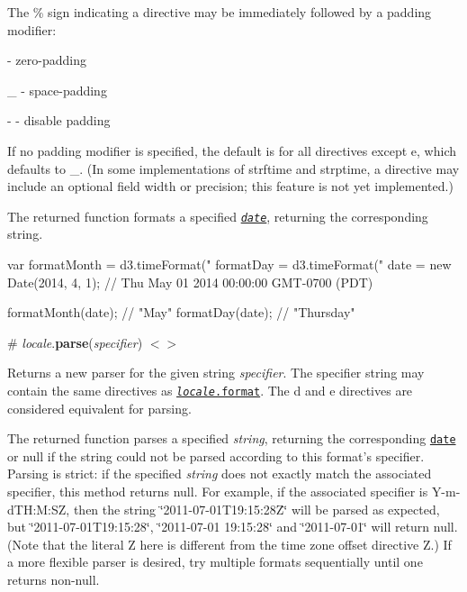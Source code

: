The {\ttfamily \%} sign indicating a directive may be immediately followed by a padding modifier\+:


\begin{DoxyItemize}
\item {} -\/ zero-\/padding
\item {\ttfamily \+\_\+} -\/ space-\/padding
\item {\ttfamily -\/} -\/ disable padding
\end{DoxyItemize}

If no padding modifier is specified, the default is {} for all directives except {\ttfamily e}, which defaults to {\ttfamily \+\_\+}. (In some implementations of strftime and strptime, a directive may include an optional field width or precision; this feature is not yet implemented.)

The returned function formats a specified {\itshape \href{https://developer.mozilla.org/en/JavaScript/Reference/Global_Objects/Date}{\tt date}}, returning the corresponding string.


\begin{DoxyCode}
var formatMonth = d3.timeFormat("%
    formatDay = d3.timeFormat("%
    date = new Date(2014, 4, 1); // Thu May 01 2014 00:00:00 GMT-0700 (PDT)

formatMonth(date); // "May"
formatDay(date); // "Thursday"
\end{DoxyCode}


\label{_locale_parse}%
\# {\itshape locale}.{\bfseries parse}({\itshape specifier}) \href{https://github.com/d3/d3-time-format/blob/master/src/locale.js#L298}{\tt $<$$>$}

Returns a new parser for the given string {\itshape specifier}. The specifier string may contain the same directives as \href{#locale_format}{\tt {\itshape locale}.format}. The {\ttfamily d} and {\ttfamily e} directives are considered equivalent for parsing.

The returned function parses a specified {\itshape string}, returning the corresponding \href{https://developer.mozilla.org/en/JavaScript/Reference/Global_Objects/Date}{\tt date} or null if the string could not be parsed according to this format’s specifier. Parsing is strict\+: if the specified {\itshape string} does not exactly match the associated specifier, this method returns null. For example, if the associated specifier is {\ttfamily Y-\/m-\/dTH\+:M\+:SZ}, then the string {\ttfamily \char`\"{}2011-\/07-\/01\+T19\+:15\+:28\+Z\char`\"{}} will be parsed as expected, but {\ttfamily \char`\"{}2011-\/07-\/01\+T19\+:15\+:28\char`\"{}}, {\ttfamily \char`\"{}2011-\/07-\/01 19\+:15\+:28\char`\"{}} and {\ttfamily \char`\"{}2011-\/07-\/01\char`\"{}} will return null. (Note that the literal {\ttfamily Z} here is different from the time zone offset directive {\ttfamily Z}.) If a more flexible parser is desired, try multiple formats sequentially until one returns non-\/null.

